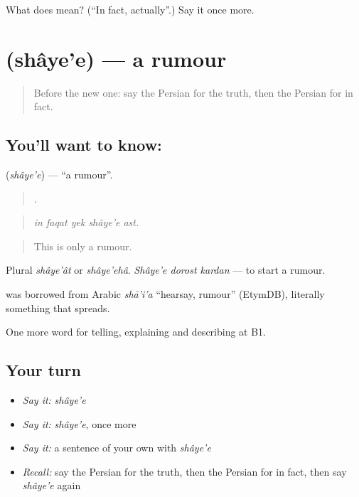 \begin{tcolorbox}[breakable,colback=teal!4,colframe=teal!35!black,title={Before you move on}]
What does   mean? (\textquotedblleft{}In fact, actually\textquotedblright{}.) Say it once more.
\end{tcolorbox}
\section[\texorpdfstring{\fa{شایعه} (shâye'e)}{شایعه (shâye'e)}]{ (shâye'e) — a rumour}

\label{lesson:FA-C364-shayee}



\begin{quote}
Before the new one: say the Persian for the truth, then the Persian for in fact.
\end{quote}

\subsection*{You'll want to know: }
\textbf{} (\emph{shâye'e}) — \textquotedblleft{}a rumour\textquotedblright{}.

\begin{quote}
    .
\end{quote}

\begin{quote}
\emph{in faqat yek shâye'e ast.}
\end{quote}

\begin{quote}
This is only a rumour.
\end{quote}

Plural \emph{shâye'ât} or \emph{shâye'ehâ}. \emph{Shâye'e dorost kardan} — to start a rumour.

\begin{cousinweb}
\textbf{} was borrowed from Arabic \emph{shā'i'a} \textquotedblleft{}hearsay, rumour\textquotedblright{} (EtymDB), literally something that spreads.
\end{cousinweb}

\begin{grammarlens}[title={What you've built}]
One more word for telling, explaining and describing at B1.
\end{grammarlens}

\subsection*{Your turn}
\begin{itemize}
\raggedright
  \item \emph{Say it:} \emph{shâye'e}
  \item \emph{Say it:} \emph{shâye'e}, once more
  \item \emph{Say it:} a sentence of your own with \emph{shâye'e}
  \item \emph{Recall:} say the Persian for the truth, then the Persian for in fact, then say \emph{shâye'e} again
\end{itemize}

